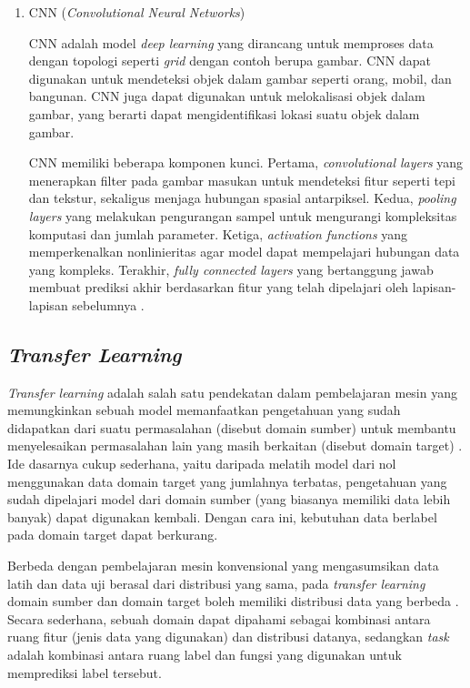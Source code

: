 \begin{enumerate}
	\item CNN (\textit{Convolutional Neural Networks})
	
	CNN adalah model \textit{deep learning} yang dirancang untuk memproses data dengan topologi seperti \textit{grid} dengan contoh berupa gambar. CNN dapat digunakan untuk mendeteksi objek dalam gambar seperti orang, mobil, dan bangunan. CNN juga dapat digunakan untuk melokalisasi objek dalam gambar, yang berarti dapat mengidentifikasi lokasi suatu objek dalam gambar. 
	
	CNN memiliki beberapa komponen kunci. Pertama, \textit{convolutional layers} yang menerapkan filter pada gambar masukan untuk mendeteksi fitur seperti tepi dan tekstur, sekaligus menjaga hubungan spasial antarpiksel. Kedua, \textit{pooling layers} yang melakukan pengurangan sampel untuk mengurangi kompleksitas komputasi dan jumlah parameter. Ketiga, \textit{activation functions} yang memperkenalkan nonlinieritas agar model dapat mempelajari hubungan data yang kompleks. Terakhir, \textit{fully connected layers} yang bertanggung jawab membuat prediksi akhir berdasarkan fitur yang telah dipelajari oleh lapisan-lapisan sebelumnya \autocite{gfg2020cnn}. 
	
\end{enumerate}

\subsection{\textit{Transfer Learning}}
\label{subsec:transferlearning}
\textit{Transfer learning} adalah salah satu pendekatan dalam pembelajaran mesin yang memungkinkan sebuah model memanfaatkan pengetahuan yang sudah didapatkan dari suatu permasalahan (disebut domain sumber) untuk membantu menyelesaikan permasalahan lain yang masih berkaitan (disebut domain target) \cite{zhuang2020comprehensive}. Ide dasarnya cukup sederhana, yaitu daripada melatih model dari nol menggunakan data domain target yang jumlahnya terbatas, pengetahuan yang sudah dipelajari model dari domain sumber (yang biasanya memiliki data lebih banyak) dapat digunakan kembali. Dengan cara ini, kebutuhan data berlabel pada domain target dapat berkurang.

Berbeda dengan pembelajaran mesin konvensional yang mengasumsikan data latih dan data uji berasal dari distribusi yang sama, pada \textit{transfer learning} domain sumber dan domain target boleh memiliki distribusi data yang berbeda \cite{zhuang2020comprehensive}. Secara sederhana, sebuah domain dapat dipahami sebagai kombinasi antara ruang fitur (jenis data yang digunakan) dan distribusi datanya, sedangkan \textit{task} adalah kombinasi antara ruang label dan fungsi yang digunakan untuk memprediksi label tersebut.

